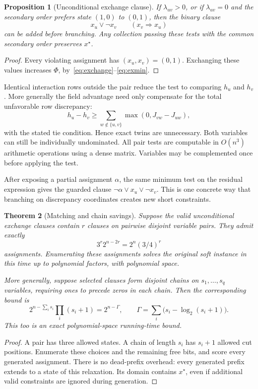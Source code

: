 \documentclass[11pt,a4paper]{article}
\newtheorem{theorem}{Theorem}
\newtheorem{proposition}[theorem]{Proposition}
\theoremstyle{remark}
\begin{document}
\begin{proposition}[Unconditional exchange clause]\label{prop:exchange}
If $\lambda_{uv}>0$, or if $\lambda_{uv}=0$ and the secondary order
prefers state $(1,0)$ to $(0,1)$, then the binary clause
\begin{equation}
 \boxed{x_u\lor\neg x_v}\qquad(x_v\Rightarrow x_u) \label{eq:implication}
\end{equation}
can be added before branching. Any collection passing these tests with
the common secondary order preserves $x^\star$.
\end{proposition}
\begin{proof}
Every violating assignment has $(x_u,x_v)=(0,1)$. Exchanging these values
increases $\Phi$, by~\eqref{eq:exchange}--\eqref{eq:exmin}.
\end{proof}

Identical interaction rows outside the pair reduce the test to comparing
$h_u$ and $h_v$. More generally the field advantage need only compensate
for the total unfavorable row discrepancy:
\[
 h_u-h_v\ge
 \sum_{w\notin\{u,v\}}\max(0,J_{vw}-J_{uw}),
\]
with the stated tie condition. Hence exact twins are unnecessary.
Both variables can still be individually undominated. All pair tests
are computable in $O(n^3)$ arithmetic operations using a dense matrix.
Variables may be complemented once before applying the test.

After exposing a partial assignment $\alpha$, the same minimum test on
the residual expression gives the guarded clause
$\neg\alpha\lor x_u\lor\neg x_v$. This is one concrete way that branching
on discrepancy coordinates creates new short constraints.

\begin{theorem}[Matching and chain savings]\label{thm:chains}
Suppose the valid unconditional exchange clauses contain $r$ clauses
on pairwise disjoint variable pairs. They admit exactly
\begin{equation}
 3^r2^{n-2r}=2^n(3/4)^r                         \label{eq:matching}
\end{equation}
assignments. Enumerating these assignments solves the original soft
instance in this time up to polynomial factors, with polynomial space.

More generally, suppose selected clauses form disjoint chains on
$s_1,\ldots,s_q$ variables, requiring ones to precede zeros in each chain.
Then the corresponding bound is
\begin{equation}
 2^{n-\sum_i s_i}\prod_i(s_i+1)=2^{n-\Gamma},
 \qquad \Gamma=\sum_i\bigl(s_i-\log_2(s_i+1)\bigr). \label{eq:chains}
\end{equation}
This too is an exact polynomial-space running-time bound.
\end{theorem}
\begin{proof}
A pair has three allowed states. A chain of length $s_i$ has $s_i+1$
allowed cut positions. Enumerate these choices and the remaining free
bits, and score every generated assignment. There is no dead-prefix
overhead: every generated prefix extends to a state of this relaxation.
Its domain contains $x^\star$, even if additional valid constraints are
ignored during generation.
\end{proof}
\end{document}
